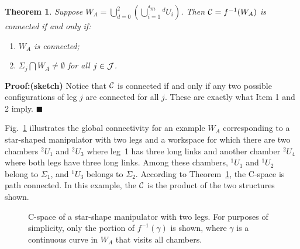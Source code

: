 \documentclass[twocolumn]{IEEEtran}
\newtheorem{Theorem}{{\bf Theorem}}
\begin{document}
\medskip

\begin{Theorem}
\label{them-1} \rm Suppose $W_A = \bigcup_{d=0}^2 \left(
\bigcup_{i=1}^{{}^d\!m} {}^d\!U_i \right)$.  Then ${\cal C} =
f^{-1}(W_A)$ is connected if and only if:
\begin{enumerate}
\item
    $W_A$ is connected;
\item
    $\Sigma_j \bigcap W_A \ne \emptyset$ for all $j \in {\cal J}$.
\end{enumerate}
\end{Theorem}

\medskip

{\bf Proof:(sketch)} Notice that ${\cal C}$ is connected if and only
if any two possible configurations of leg $j$ are connected for all
$j$. These are exactly what Item 1 and 2 imply.
%
\hfill$\blacksquare$\medskip

Fig.~\ref{fibre} illustrates the global connectivity for an example
$W_A$ corresponding to a star-shaped manipulator with two legs and a
workspace for which there are two chambers $^2U_1$ and $^2U_3$ where
leg~1 has three long links and another chamber $^2U_4$ where both
legs have three long links.  Among these chambers, ${}^1\!U_1$ and
${}^1\!U_2$ belong to $\Sigma_1$, and ${}^1\!U_3$ belongs to
$\Sigma_2$. According to Theorem~\ref{them-1}, the C-space is path
connected.  In this example, the ${\cal C}$ is the product of the
two structures shown.
\begin{figure}
 \vbox{
      }
 \caption{C-space of a star-shape manipulator with two legs.
 For purposes of simplicity, only the portion of $f^{-1}(\gamma)$
 is shown, where $\gamma$ is a continuous curve in $W_A$
 that visits all chambers. }
 \label{fibre}
\end{figure}
\end{document}
